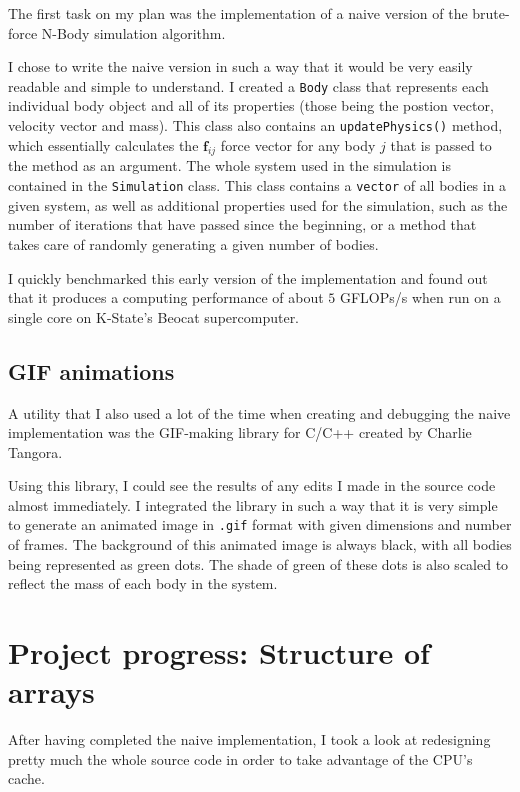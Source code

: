 \documentclass[journal]{IEEEtran}
\begin{document}
		The first task on my plan was the implementation of a naive version of the brute-force N-Body simulation algorithm. 
		
		I chose to write the naive version in such a way that it would be very easily readable and simple to understand. I created a \texttt{Body} class that represents each individual body object and all of its properties (those being the postion vector, velocity vector and mass). This class also contains an \texttt{updatePhysics()} method, which essentially calculates the $\textbf{f}_{ij}$ force vector for any body $j$ that is passed to the method as an argument. The whole system used in the simulation is contained in the \texttt{Simulation} class. This class contains a \texttt{vector} of all bodies in a given system, as well as additional properties used for the simulation, such as the number of iterations that have passed since the beginning, or a method that takes care of randomly generating a given number of bodies.
		
		I quickly benchmarked this early version of the implementation and found out that it produces a computing performance of about $5$ GFLOPs/s when run on a single core on K-State's Beocat supercomputer.
		
		\subsection*{GIF animations}
		
			A utility that I also used a lot of the time when creating and debugging the naive implementation was the GIF-making library for C/C++ created by Charlie Tangora. \cite{gif}
			
			Using this library, I could see the results of any edits I made in the source code almost immediately. I integrated the library in such a way that it is very simple to generate an animated image in \texttt{.gif} format with given dimensions and number of frames. The background of this animated image is always black, with all bodies being represented as green dots. The shade of green of these dots is also scaled to reflect the mass of each body in the system.
		
	\section{Project progress: Structure of arrays}
		
		After having completed the naive implementation, I took a look at redesigning pretty much the whole source code in order to take advantage of the CPU's cache.
		
\end{document}
